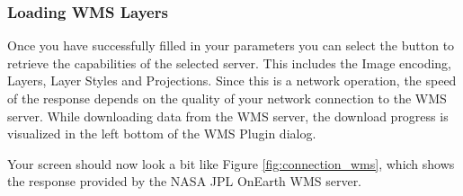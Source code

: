 
\subsubsection{Loading WMS Layers}\label{sec:ogc-wms-layers}

Once you have successfully filled in your parameters you can select the
button to retrieve the capabilities of the selected server.  This includes the Image encoding,
Layers, Layer Styles and Projections.  Since this
is a network operation, the speed of the response depends on the quality of your network
connection to the WMS server. While downloading data from the WMS server, the download progress 
is visualized in the left bottom of the WMS Plugin dialog. 

Your screen should now look a bit like Figure \ref{fig:connection_wms}, which shows the 
response provided by the NASA JPL OnEarth WMS server.

